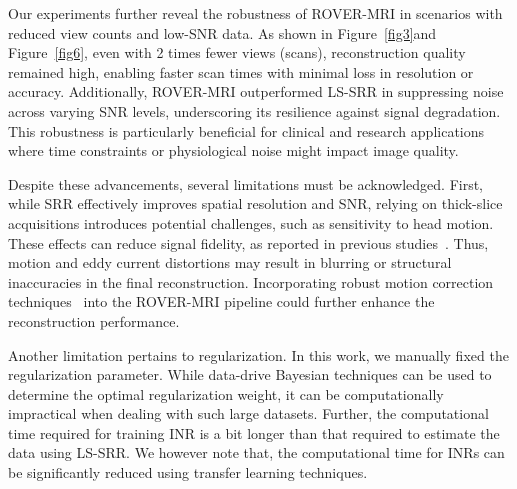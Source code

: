 \documentclass[AMA,STIX2COL]{MRM}
\begin{document}
Our experiments further reveal the robustness of ROVER-MRI in scenarios with reduced view counts and low-SNR data. As shown in Figure~\ref{fig3}and Figure~\ref{fig6}, even with 2 times fewer views (scans), reconstruction quality remained high, enabling faster scan times with minimal loss in resolution or accuracy. Additionally, ROVER-MRI outperformed LS-SRR in suppressing noise across varying SNR levels, underscoring its resilience against signal degradation. This robustness is particularly beneficial for clinical and research applications where time constraints or physiological noise might impact image quality.

Despite these advancements, several limitations must be acknowledged. First, while SRR effectively improves spatial resolution and SNR, relying on thick-slice acquisitions introduces potential challenges, such as sensitivity to head motion. These effects can reduce signal fidelity, as reported in previous studies~\cite{shilling2008super, plenge2012super}. Thus, motion and eddy current distortions may result in blurring or structural inaccuracies in the final reconstruction. Incorporating robust motion correction techniques~\cite{szczepankiewicz2019tensor} into the ROVER-MRI pipeline could further enhance the reconstruction performance.

Another limitation pertains to regularization. In this work, we manually fixed the regularization parameter. While data-drive Bayesian techniques can be used to determine the optimal regularization weight, it can be computationally impractical when dealing with such large datasets. Further, the computational time required for training INR is a bit longer than that required to estimate the data using LS-SRR. We however note that, the computational time for INRs can be significantly reduced using transfer learning techniques. %

\end{document}
